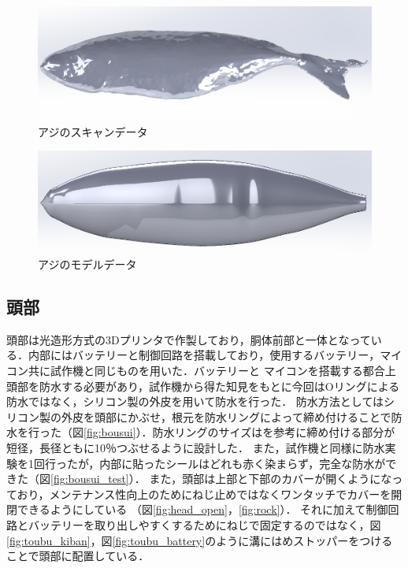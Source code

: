 \begin{figure}[t]
    \centering
    \includegraphics[width=0.7\linewidth]{chapters/picture/scan.png}
    \caption{アジのスキャンデータ}
    \label{fig:data_scan}
\end{figure}
\begin{figure}[t]
    \centering
    \includegraphics[width=0.7\linewidth]{chapters/picture/fishkinji2.png}
    \caption{アジのモデルデータ}
    \label{fig:data_model}
\end{figure}

\subsection{頭部}
頭部は光造形方式の3Dプリンタで作製しており，胴体前部と一体となっている．内部にはバッテリーと制御回路を搭載しており，使用するバッテリー，マイコン共に試作機と同じものを用いた．バッテリーと
マイコンを搭載する都合上頭部を防水する必要があり，試作機から得た知見をもとに今回はOリングによる防水ではなく，シリコン製の外皮を用いて防水を行った．
防水方法としてはシリコン製の外皮を頭部にかぶせ，根元を防水リングによって締め付けることで防水を行った（図\ref{fig:bousui}）．防水リングのサイズは\cite{juuiti}を参考に締め付ける部分が
短径，長径ともに10％つぶせるように設計した．
また，試作機と同様に防水実験を1回行ったが，内部に貼ったシールはどれも赤く染まらず，完全な防水ができた（図\ref{fig:bousui_test}）．
また，頭部は上部と下部のカバーが開くようになっており，メンテナンス性向上のためにねじ止めではなくワンタッチでカバーを開閉できるようにしている
（図\ref{fig:head_open}，\ref{fig:rock}）．
それに加えて制御回路とバッテリーを取り出しやすくするためにねじで固定するのではなく，図\ref{fig:toubu_kiban}，図\ref{fig:toubu_battery}のように溝にはめストッパーをつける
ことで頭部に配置している．

